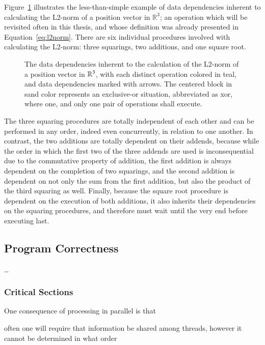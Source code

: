 Figure~\ref{fig:dataDependencyOfL2Norm} illustrates the less-than-simple example of data dependencies inherent to calculating the L2-norm of a position vector in $\mathbb{R}^{3}$; an operation which will be revisited often in this thesis, and whose definition was already presented in Equation~\ref{eq:l2norm}. There are six individual procedures involved with calculating the L2-norm: three squarings, two additions, and one square root.

\begin{figure}[ht]
	
	{\caption[Data Dependencies in the L2-norm Calculation]{The data dependencies inherent to the calculation of the L2-norm of a position vector in $\mathbb{R}^{3}$, with each distinct operation colored in teal, and data dependencies marked with arrows. The centered block in sand color represents an exclusive-or situation, abbreviated as xor, where one, and only one pair of operations shall execute.}\label{fig:dataDependencyOfL2Norm}}
\end{figure}

The three squaring procedures are totally independent of each other and can be performed in any order, indeed even concurrently, in relation to one another. In contrast, the two additions are totally dependent on their addends, because while the order in which the first two of the three addends are used is inconsequential due to the commutative property of addition, the first addition is always dependent on the completion of two squarings, and the second addition is dependent on not only the sum from the first addition, but also the product of the third squaring as well. Finally, because the square root procedure is dependent on the execution of both additions, it also inherits their dependencies on the squaring procedures, and therefore must wait until the very end before executing last.

%
%
%
%
\subsection{Program Correctness}
\ldots

%
%
\subsubsection{Critical Sections}
One consequence of processing in parallel is that

often one will require that information be shared among threads, however it cannot be determined in what order


